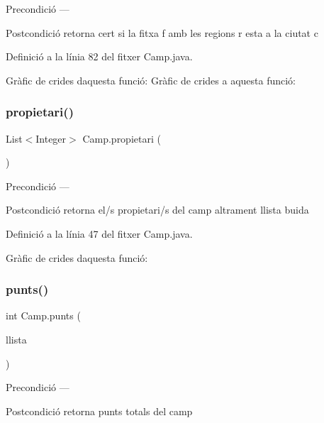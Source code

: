 \begin{DoxyPrecond}{Precondició}
--- 
\end{DoxyPrecond}
\begin{DoxyPostcond}{Postcondició}
retorna cert si la fitxa f amb les regions r esta a la ciutat c 
\end{DoxyPostcond}


Definició a la línia 82 del fitxer Camp.\+java.

Gràfic de crides d\textquotesingle{}aquesta funció\+:
Gràfic de crides a aquesta funció\+:
\mbox{\label{class_camp_a24ebece7eea1aa266390b8762c0a1aa5}} 
\subsubsection{\texorpdfstring{propietari()}{propietari()}}
{\footnotesize\ttfamily List$<$Integer$>$ Camp.\+propietari (\begin{DoxyParamCaption}{ }\end{DoxyParamCaption})}

\begin{DoxyPrecond}{Precondició}
--- 
\end{DoxyPrecond}
\begin{DoxyPostcond}{Postcondició}
retorna el/s propietari/s del camp altrament llista buida 
\end{DoxyPostcond}


Definició a la línia 47 del fitxer Camp.\+java.

Gràfic de crides d\textquotesingle{}aquesta funció\+:
\mbox{\label{class_camp_aa62c5e5ffa6084bb8363c5efba469068}} 
\subsubsection{\texorpdfstring{punts()}{punts()}\hspace{0.1cm}{\footnotesize\ttfamily [1/2]}}
{\footnotesize\ttfamily int Camp.\+punts (\begin{DoxyParamCaption}\item[{Array\+List$<$ \mbox{\hyperlink{class_ciutat}{Ciutat}} $>$}]{llista }\end{DoxyParamCaption})}

\begin{DoxyPrecond}{Precondició}
--- 
\end{DoxyPrecond}
\begin{DoxyPostcond}{Postcondició}
retorna punts totals del camp 
\end{DoxyPostcond}



